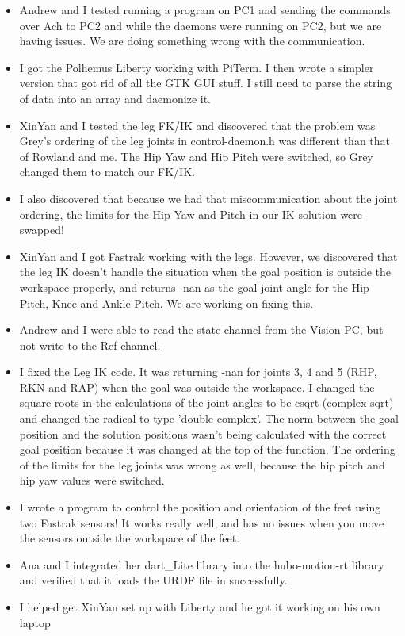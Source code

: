 \documentclass[letterpaper, 10 pt]{report}
\begin{document}
\begin{itemize}
\item Andrew and I tested running a program on PC1 and sending the commands over
Ach to PC2 and while the daemons were running on PC2, but we are having issues.
We are doing something wrong with the communication.
\item I got the Polhemus Liberty working with PiTerm. I then wrote a simpler version
that got rid of all the GTK GUI stuff. I still need to parse the string of data
into an array and daemonize it.
\item XinYan and I tested the leg FK/IK and discovered that the problem was Grey's
ordering of the leg joints in control-daemon.h was different than that of
Rowland and me. The Hip Yaw and Hip Pitch were switched, so Grey changed them to
match our FK/IK.
\item I also discovered that because we had that miscommunication about the joint
ordering, the limits for the Hip Yaw and Pitch in our IK solution were swapped!
\item XinYan and I got Fastrak working with the legs. However, we discovered that the
leg IK doesn't handle the situation when the goal position is outside the
workspace properly, and returns -nan as the goal joint angle for the Hip Pitch,
Knee and Ankle Pitch. We are working on fixing this.
\item Andrew and I were able to read the state channel from the Vision PC, but not
write to the Ref channel.
\item I fixed the Leg IK code. It was returning -nan for joints 3, 4 and 5 (RHP, RKN
and RAP) when the goal was outside the workspace. I changed the square roots in
the calculations of the joint angles to be csqrt (complex sqrt) and changed the
radical to type 'double complex'. The norm between the goal position and the
solution positions wasn't being calculated with the correct goal position
because it was changed at the top of the function. The ordering of the limits
for the leg joints was wrong as well, because the hip pitch and hip yaw values
were switched.
\item I wrote a program to control the position and orientation of the feet using two
Fastrak sensors! It works really well, and has no issues when you move the
sensors outside the workspace of the feet.
\item Ana and I integrated her dart\_Lite library into the hubo-motion-rt library and
verified that it loads the URDF file in successfully.
\item I helped get XinYan set up with Liberty and he got it working on his own laptop

\end{itemize}
\end{document}
